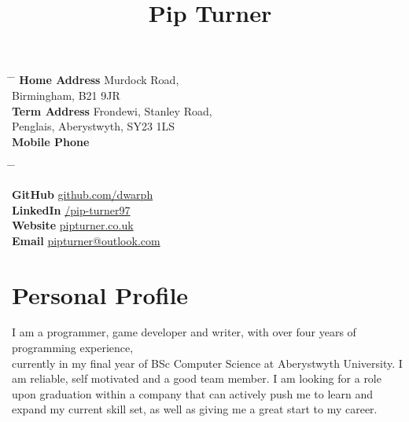 \documentclass[10pt]{article} %
\begin{document}

\title{Pip Turner} %


\parbox{0.5\textwidth}{ %
\begin{tabbing} %
\hspace{3cm} \= \hspace{4cm} \= \kill %
{\bf Home Address}  Murdock Road,\\ %
\> Birmingham, B21 9JR \\ %
{\bf Term Address} \> Frondewi, Stanley Road,\\ %
\> Penglais, Aberystwyth, SY23 1LS \\ %


{\bf Mobile Phone}  \\ %
\end{tabbing}}
\hfill %
\parbox{0.5\textwidth}{ %
\begin{tabbing} %
\hspace{3cm} \= \hspace{4cm} \= \kill %


{\bf GitHub} \> \href{www.github.com/dwarph}{github.com/dwarph}\\ %
{\bf LinkedIn} \> \href{https://www.linkedin.com/in/pip-turner97}{/pip-turner97}\\ %
{\bf Website} \> \href{pipturner.co.uk}{pipturner.co.uk}\\ %
{\bf Email} \> \href{mailto:pipturner@outlook.com}{pipturner@outlook.com} \\ %

\end{tabbing}}


\section{Personal Profile}
I am a programmer, game developer and writer, with over four years of programming experience, \\currently in my final year of BSc Computer Science at Aberystwyth University. I am reliable, self motivated and a good team member. I am looking for a role upon graduation within a company that can actively push me to learn and expand my current skill set, as well as giving me a great start to my career.
\end{document}
